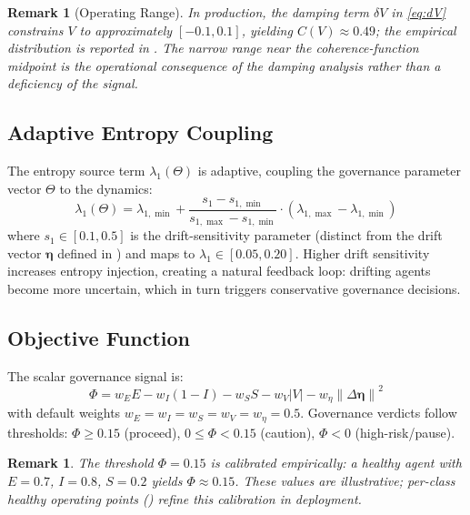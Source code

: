 \documentclass[11pt,twocolumn]{article}
\newtheorem{remark}[theorem]{Remark}
\newcommand{\norm}[1]{\left\lVert #1 \right\rVert}
\newcommand{\abs}[1]{\left| #1 \right|}
\newcommand{\deta}{\ensuremath{\Delta\bm{\eta}}}
\begin{document}
\begin{remark}[Operating Range]
\label{rem:operating-range}
In production, the damping term $\delta V$ in \eqref{eq:dV} constrains
$V$ to approximately $[-0.1, 0.1]$, yielding $C(V) \approx 0.49$; the
empirical distribution is reported in . The
narrow range near the coherence-function midpoint is the operational
consequence of the damping analysis rather than a deficiency of the
signal.
\end{remark}

\subsection{Adaptive Entropy Coupling}

The entropy source term $\lambda_1(\Theta)$ is adaptive, coupling the
governance parameter vector $\Theta$ to the dynamics:
\begin{equation}
  \lambda_1(\Theta) = \lambda_{1,\min} +
  \frac{s_1 - s_{1,\min}}{s_{1,\max} - s_{1,\min}}
  \cdot (\lambda_{1,\max} - \lambda_{1,\min})
  \label{eq:lambda1}
\end{equation}
where $s_1 \in [0.1, 0.5]$ is the drift-sensitivity parameter
(distinct from the drift vector $\bm\eta$ defined in
) and maps to $\lambda_1 \in [0.05, 0.20]$.
Higher drift sensitivity increases entropy injection, creating
a natural feedback loop: drifting agents become more uncertain, which
in turn triggers conservative governance decisions.

\subsection{Objective Function}

The scalar governance signal is:
\begin{equation}
  \Phi = w_E E - w_I(1-I) - w_S S - w_V\abs{V} - w_\eta\norm{\deta}^2
  \label{eq:phi}
\end{equation}
with default weights $w_E = w_I = w_S = w_V = w_\eta = 0.5$.
Governance verdicts follow thresholds: $\Phi \geq 0.15$ (proceed),
$0 \leq \Phi < 0.15$ (caution), $\Phi < 0$ (high-risk/pause).

\begin{remark}
The threshold $\Phi = 0.15$ is calibrated empirically: a healthy
agent with $E = 0.7$, $I = 0.8$, $S = 0.2$ yields $\Phi \approx
0.15$. These values are illustrative; per-class healthy operating
points () refine this calibration in
deployment.
\end{remark}
\end{document}
